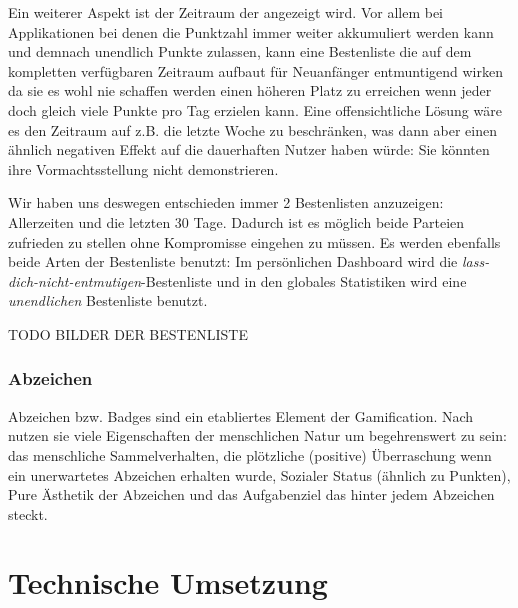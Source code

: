 \documentclass[12pt,twoside]{book}
\begin{document}
Ein weiterer Aspekt ist der Zeitraum der angezeigt wird. Vor allem bei Applikationen bei denen die Punktzahl immer weiter akkumuliert werden kann und demnach unendlich Punkte zulassen, kann eine Bestenliste die auf dem kompletten verfügbaren Zeitraum aufbaut für Neuanfänger entmuntigend wirken da sie es wohl nie schaffen werden einen höheren Platz zu erreichen wenn jeder doch gleich viele Punkte pro Tag erzielen kann.
Eine offensichtliche Lösung wäre es den Zeitraum auf z.B. die letzte Woche zu beschränken, was dann aber einen ähnlich negativen Effekt auf die dauerhaften Nutzer haben würde: Sie könnten ihre Vormachtsstellung nicht demonstrieren.

Wir haben uns deswegen entschieden immer 2 Bestenlisten anzuzeigen: Allerzeiten und die letzten 30 Tage. Dadurch ist es möglich beide Parteien zufrieden zu stellen ohne Kompromisse eingehen zu müssen. Es werden ebenfalls beide Arten der Bestenliste benutzt: Im persönlichen Dashboard wird die \textit{lass-dich-nicht-entmutigen}-Bestenliste und in den globales Statistiken wird eine \textit{unendlichen} Bestenliste benutzt.

TODO BILDER DER BESTENLISTE

\subsection{Abzeichen}

Abzeichen bzw. Badges sind ein etabliertes Element der Gamification. Nach \citep{zichermann2011gamification} nutzen sie viele Eigenschaften der menschlichen Natur um begehrenswert zu sein: das menschliche Sammelverhalten, die plötzliche (positive) Überraschung wenn ein unerwartetes Abzeichen erhalten wurde, Sozialer Status (ähnlich zu Punkten), Pure Ästhetik der Abzeichen und das Aufgabenziel das hinter jedem Abzeichen steckt.

%

\chapter{Technische Umsetzung}
\end{document}
